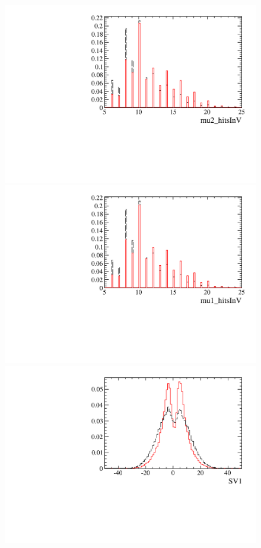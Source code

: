 \begin{figure} [htb!]
\begin{center}
\includegraphics[scale=0.20]{figs/mu2_hitsInVFULL2pipi.pdf}
\includegraphics[scale=0.20]{figs/mu1_hitsInVFULL2pipi.pdf}
\includegraphics[scale=0.20]{figs/SV1FULL2pipi.pdf}

\end{center}
\end{figure}
